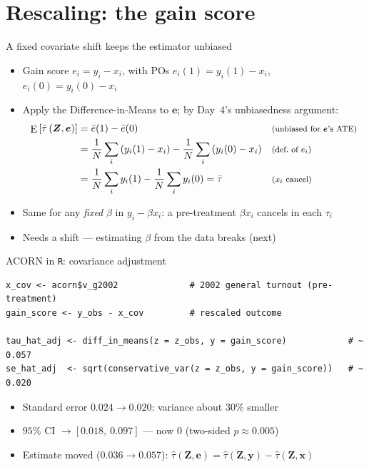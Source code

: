 \documentclass[table, xcolor = {dvipsnames}, 9pt]{beamer}
\theoremstyle{plain}
\newcommand{\mh}[1]{{\color{magenta}{#1}}}
\DeclareMathOperator{\E}{\rm{E}}
\begin{document}
\section{Rescaling: the gain score}

\begin{frame}[t]{A fixed covariate shift keeps the estimator unbiased}
\small
\vfill
\begin{itemize} \vfill
\item Gain score $e_i = y_i - x_i$, with POs $e_i(1) = y_i(1) - x_i$, $e_i(0) = y_i(0) - x_i$ \vfill
\item Apply the Difference-in-Means to $\bm{e}$; by Day~4's unbiasedness argument:
\begin{align*}
\E\left[\hat{\tau}\left(\bm{Z}, \bm{e}\right)\right]
 &= \bar{e}(1) - \bar{e}(0)
 && \text{\footnotesize (unbiased for $\bm{e}$'s ATE)} \\
 &= \frac{1}{N}\sum_i \left(y_i(1) - x_i\right) - \frac{1}{N}\sum_i \left(y_i(0) - x_i\right)
 && \text{\footnotesize (def.\ of $e_i$)} \\
 &= \frac{1}{N}\sum_i y_i(1) - \frac{1}{N}\sum_i y_i(0) = \mh{\bar{\tau}}
 && \text{\footnotesize ($x_i$ cancel)}
\end{align*} \vfill
\item Same for any \emph{fixed} $\beta$ in $y_i - \beta x_i$: a pre-treatment $\beta x_i$ cancels in each $\tau_i$ \vfill
\item Needs a \mh{fixed} shift --- estimating $\beta$ from the data breaks \mh{unbiasedness} (next) \vfill
\end{itemize} \vfill
\end{frame}
\begin{frame}[fragile]{ACORN in \texttt{R}: covariance adjustment}
\begin{lstlisting}[style=Rstyle, basicstyle=\ttfamily\tiny, frame=single]
x_cov <- acorn$v_g2002              # 2002 general turnout (pre-treatment)
gain_score <- y_obs - x_cov         # rescaled outcome

tau_hat_adj <- diff_in_means(z = z_obs, y = gain_score)            # ~ 0.057
se_hat_adj  <- sqrt(conservative_var(z = z_obs, y = gain_score))   # ~ 0.020
\end{lstlisting}
\begin{itemize} \vfill
\item Standard error $0.024 \to 0.020$: variance about $30\%$ smaller \vfill
\item $95\%$ CI $\to [0.018,\ 0.097]$ --- now \mh{excludes} $0$ (two-sided $p \approx 0.005$) \vfill
\item Estimate moved ($0.036 \to 0.057$): $\hat{\tau}\left(\bm{Z},\bm{e}\right) = \hat{\tau}\left(\bm{Z},\bm{y}\right) - \hat{\tau}\left(\bm{Z},\bm{x}\right)$ \vfill
\end{itemize}
\end{frame}
\end{document}
